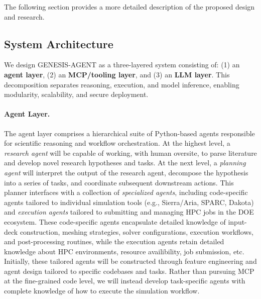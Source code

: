 \documentclass[11pt]{article} \usepackage[margin=1in]{geometry}
\begin{document}
The following section provides a more detailed description of the proposed
design and research.
 
\subsection*{System Architecture}
We design GENESIS-AGENT as a three-layered system consisting of: (1) an
\textbf{agent layer}, (2) an \textbf{MCP/tooling layer}, and (3) an \textbf{LLM
layer}. This decomposition separates reasoning, execution, and model inference,
enabling modularity, scalability, and secure deployment.


\paragraph{Agent Layer.} The agent layer comprises a hierarchical suite of
Python-based agents responsible for scientific reasoning and workflow
orchestration. At the highest level, a \textit{research agent} will be capable of
working, with human oversite, to parse literature and develop novel research
hypotheses and tasks. At the next level, a \textit{planning agent} will
interpret the output of the research agent, decompose the hypothesis into a
series of tasks, and coordinate subsequent downstream actions. This planner interfaces with a collection of \emph{specialized agents},
including code-specific agents tailored to individual simulation tools (e.g.,
Sierra/Aria, SPARC, Dakota) and \textit{execution agents} tailored to submitting
and managing HPC jobs in the DOE ecosystem. These code-specific agents encapsulate detailed
knowledge of input-deck construction, meshing strategies, solver configurations,
execution workflows, and post-processing routines, while the execution agents
retain detailed knowledge about HPC environments, resource availibility, job
submission, etc. Initially, these tailored agents will be constructed through feature engineering
and agent design tailored to specific codebases and tasks. Rather than pursuing MCP at the fine-grained code level, we will
instead develop task-specific agents with complete knowledge of how to execute
the simulation workflow. 
\end{document}
